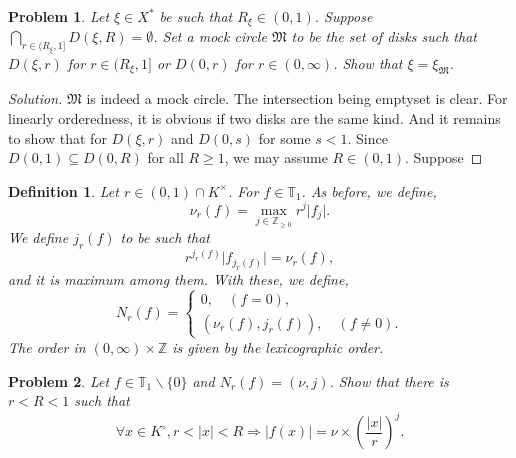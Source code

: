 \documentclass[8pt]{article}
\numberwithin{equation}{section}
\newenvironment{solution}{\begin{proof}[Solution]}{\end{proof}}
\newtheorem{definition}{Definition}[section]
\newtheorem{problem}{Problem}[section]
\newcommand{\Z}[0]{\mathbb{Z}}
\newcommand{\T}[0]{\mathbb{T}}
\newcommand{\ab}[1]{\vert #1 \vert}
\begin{document}
\begin{problem}
  Let $\xi\in X^*$ be such that $R_\xi\in(0,1)$. Suppose $\bigcap_{r\in (R_\xi,1]}D(\xi,R)=\emptyset$. Set a mock circle $\mathfrak{M}$ to be the set of disks such that $D(\xi,r)$ for $r\in (R_\xi,1]$ or $D(0,r)$ for $r\in (0,\infty)$. Show that $\xi = \xi_\mathfrak{M}$.
\end{problem}
\begin{solution}
  $\mathfrak{M}$ is indeed a mock circle. The intersection being emptyset is clear. For linearly orderedness, it is obvious if two disks are the same kind. And it remains to show that for $D(\xi,r)$ and $D(0,s)$ for some $s<1$. 
  Since $D(0,1)\subseteq D(0,R)$ for all $R\geq1$, we may assume $R\in(0,1)$. Suppose 
\end{solution}
\begin{definition}
  Let $r\in (0,1)\cap K^\times$. For $f\in\T_1$. As before, we define,
  \begin{equation*}
    \nu_r(f) = \max_{j\in\Z_{\geq0}}r^j\ab{f_j}.
  \end{equation*}
  We define $j_r(f)$ to be such that 
  \begin{equation*}
    r^{j_r(f)}\ab{f_{j_r(f)}} = \nu_r(f),
  \end{equation*}
  and it is maximum among them. With these, we define,
  \begin{equation*}
    N_r(f) = \begin{cases}
      0,\quad(f=0),\\
      (\nu_r(f),j_r(f)),\quad(f\not=0).
    \end{cases}
  \end{equation*}
  The order in $(0,\infty)\times\Z$ is given by the lexicographic order.
\end{definition}
\begin{problem}
  Let $f\in\T_1\backslash\{0\}$ and $N_r(f) = (\nu,j)$. Show that there is $r<R<1$ such that 
  \begin{equation*}
    \forall x\in K^\circ, r<\ab{x}<R\Rightarrow\ab{f(x)}=\nu\times\left({\frac {\ab{x}} {r}}\right)^j.
  \end{equation*} 
\end{problem}
\end{document}

